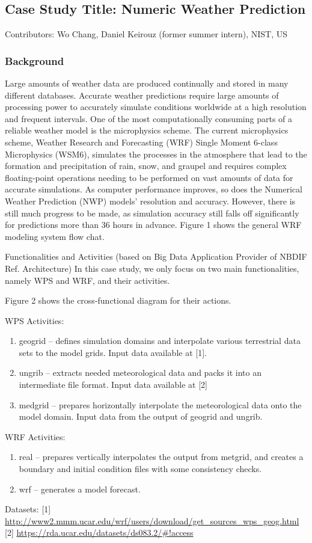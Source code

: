 \subsection{Case Study Title: Numeric Weather Prediction}

Contributors: Wo Chang, Daniel Keirouz (former summer intern), NIST, US

\subsubsection{Background}

Large amounts of weather data are produced continually and stored in many different databases.
Accurate weather predictions require large amounts of processing power to accurately simulate
conditions worldwide at a high resolution and frequent intervals. One of the most computationally
consuming parts of a reliable weather model is the microphysics scheme. The current microphysics
scheme, Weather Research and Forecasting (WRF) Single Moment 6-class Microphysics (WSM6),
simulates the processes in the atmosphere that lead to the formation and precipitation of rain, snow,
and graupel and requires complex floating-point operations needing to be performed on vast
amounts of data for accurate simulations. As computer performance improves, so does the Numerical
Weather Prediction (NWP) models' resolution and accuracy. However, there is still much progress to
be made, as simulation accuracy still falls off significantly for predictions more than 36 hours in
advance. Figure 1 shows the general WRF modeling system flow chat. 

Functionalities and Activities (based on Big Data Application Provider of NBDIF Ref. Architecture)
In this case study, we only focus on two main functionalities, namely WPS and WRF, and their activities.

Figure 2 shows the cross-functional diagram for their actions.

WPS Activities:

\begin{enumerate}
\item geogrid – defines simulation domains and interpolate various terrestrial data sets to the
model grids. Input data available at [1].
\item ungrib – extracts needed meteorological data and packs it into an intermediate file format.
Input data available at [2]
\item medgrid – prepares horizontally interpolate the meteorological data onto the model domain.
Input data from the output of geogrid and ungrib.
\end{enumerate}

WRF Activities:

\begin{enumerate}
\item real – prepares vertically interpolates the output from metgrid, and creates a boundary and initial
condition files with some consistency checks.
\item wrf – generates a model forecast.
\end{enumerate}

Datasets:
[1] \url{http://www2.mmm.ucar.edu/wrf/users/download/get_sources_wps_geog.html}
[2] \url{https://rda.ucar.edu/datasets/ds083.2/#!access}